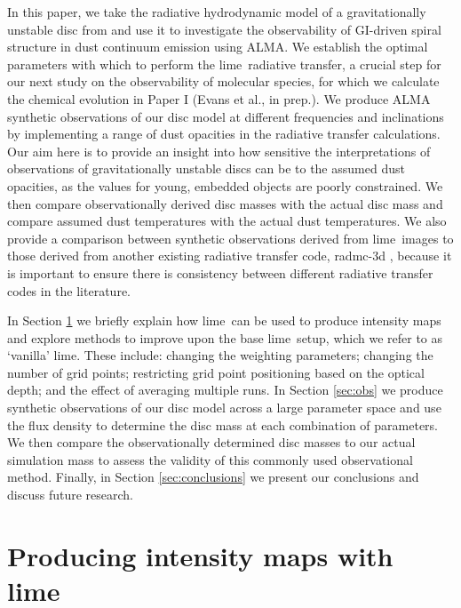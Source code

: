 \documentclass[fleqn,usenatbib]{mnras}
\newcommand{\lime}{{\sc lime}}
\begin{document}
\smallskip

In this paper, we take the radiative hydrodynamic model of a gravitationally unstable disc from  and use it to investigate the observability of GI-driven spiral structure in dust continuum emission using ALMA. We establish the optimal parameters with which to perform the \lime\ radiative transfer, a crucial step for our next study on the observability of molecular species, for which we calculate the chemical evolution in Paper I (Evans et al., in prep.). We produce ALMA synthetic observations of our disc model at different frequencies and inclinations by implementing a range of dust opacities in the radiative transfer calculations. Our aim here is to provide an insight into how sensitive the interpretations of observations of gravitationally unstable discs can be to the assumed dust opacities, as the values for young, embedded objects are poorly constrained. We then compare observationally derived disc masses with the actual disc mass and compare assumed dust temperatures with the actual dust temperatures. We also provide a comparison between synthetic observations derived from \lime\ images to those derived from another existing radiative transfer code, {\sc radmc-3d} \citep{Dullemond&Juhasz2012}, because it is important to ensure there is consistency between different radiative transfer codes in the literature.

\smallskip

In Section \ref{sec:LIME} we briefly explain how \lime\ can be used to produce intensity maps and explore methods to improve upon the base \lime\ setup, which we refer to as `vanilla' \lime. These include: changing the weighting parameters; changing the number of grid points; restricting grid point positioning based on the optical depth; and the effect of averaging multiple runs. In Section \ref{sec:obs} we produce synthetic observations of our disc model across a large parameter space and use the flux density to determine the disc mass at each combination of parameters. We then compare the observationally determined disc masses to our actual simulation mass to assess the validity of this commonly used observational method. Finally, in Section \ref{sec:conclusions} we present our conclusions and discuss future research.

\section{Producing intensity maps with \lime}
\label{sec:LIME}
\end{document}
